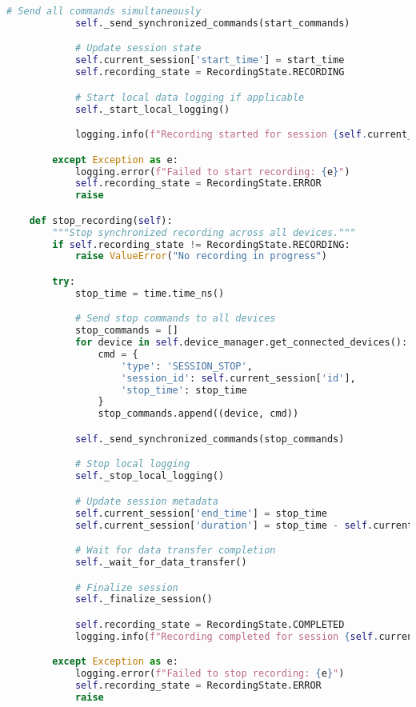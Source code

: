 \begin{lstlisting}[language=Python, caption=Session Management Implementation]
            # Send all commands simultaneously
            self._send_synchronized_commands(start_commands)

            # Update session state
            self.current_session['start_time'] = start_time
            self.recording_state = RecordingState.RECORDING

            # Start local data logging if applicable
            self._start_local_logging()

            logging.info(f"Recording started for session {self.current_session['id']}")

        except Exception as e:
            logging.error(f"Failed to start recording: {e}")
            self.recording_state = RecordingState.ERROR
            raise

    def stop_recording(self):
        """Stop synchronized recording across all devices."""
        if self.recording_state != RecordingState.RECORDING:
            raise ValueError("No recording in progress")

        try:
            stop_time = time.time_ns()

            # Send stop commands to all devices
            stop_commands = []
            for device in self.device_manager.get_connected_devices():
                cmd = {
                    'type': 'SESSION_STOP',
                    'session_id': self.current_session['id'],
                    'stop_time': stop_time
                }
                stop_commands.append((device, cmd))

            self._send_synchronized_commands(stop_commands)

            # Stop local logging
            self._stop_local_logging()

            # Update session metadata
            self.current_session['end_time'] = stop_time
            self.current_session['duration'] = stop_time - self.current_session['start_time']

            # Wait for data transfer completion
            self._wait_for_data_transfer()

            # Finalize session
            self._finalize_session()

            self.recording_state = RecordingState.COMPLETED
            logging.info(f"Recording completed for session {self.current_session['id']}")

        except Exception as e:
            logging.error(f"Failed to stop recording: {e}")
            self.recording_state = RecordingState.ERROR
            raise


\end{lstlisting}
